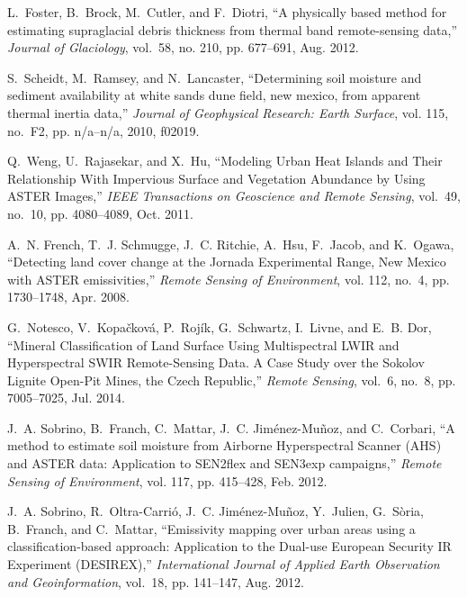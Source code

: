 \begin{thebibliography}{10}
L.~Foster, B.~Brock, M.~Cutler, and F.~Diotri, ``A physically based method for
  estimating supraglacial debris thickness from thermal band remote-sensing
  data,'' \emph{Journal of Glaciology}, vol.~58, no. 210, pp. 677--691, Aug.
  2012.

S.~Scheidt, M.~Ramsey, and N.~Lancaster, ``Determining soil moisture and
  sediment availability at white sands dune field, new mexico, from apparent
  thermal inertia data,'' \emph{Journal of Geophysical Research: Earth
  Surface}, vol. 115, no.~F2, pp. n/a--n/a, 2010, f02019.

Q.~Weng, U.~Rajasekar, and X.~Hu, ``Modeling {Urban} {Heat} {Islands} and
  {Their} {Relationship} {With} {Impervious} {Surface} and {Vegetation}
  {Abundance} by {Using} {ASTER} {Images},'' \emph{IEEE Transactions on
  Geoscience and Remote Sensing}, vol.~49, no.~10, pp. 4080--4089, Oct. 2011.

A.~N. French, T.~J. Schmugge, J.~C. Ritchie, A.~Hsu, F.~Jacob, and K.~Ogawa,
  ``Detecting land cover change at the {Jornada} {Experimental} {Range}, {New}
  {Mexico} with {ASTER} emissivities,'' \emph{Remote Sensing of Environment},
  vol. 112, no.~4, pp. 1730--1748, Apr. 2008.

G.~Notesco, V.~Kopa\v{c}kov\'{a}, P.~Roj\'{i}k, G.~Schwartz, I.~Livne, and
  E.~B. Dor, ``Mineral {Classification} of {Land} {Surface} {Using}
  {Multispectral} {LWIR} and {Hyperspectral} {SWIR} {Remote}-{Sensing} {Data}.
  {A} {Case} {Study} over the {Sokolov} {Lignite} {Open}-{Pit} {Mines}, the
  {Czech} {Republic},'' \emph{Remote Sensing}, vol.~6, no.~8, pp. 7005--7025,
  Jul. 2014.

J.~A. Sobrino, B.~Franch, C.~Mattar, J.~C. Jim\'{e}nez-Mu\~{n}oz, and
  C.~Corbari, ``A method to estimate soil moisture from {Airborne}
  {Hyperspectral} {Scanner} ({AHS}) and {ASTER} data: {Application} to
  {SEN}2flex and {SEN}3exp campaigns,'' \emph{Remote Sensing of Environment},
  vol. 117, pp. 415--428, Feb. 2012.

J.~A. Sobrino, R.~Oltra-Carri\'{o}, J.~C. Jim\'{e}nez-Mu\~{n}oz, Y.~Julien,
  G.~S\`{o}ria, B.~Franch, and C.~Mattar, ``Emissivity mapping over urban areas
  using a classification-based approach: {Application} to the {Dual}-use
  {European} {Security} {IR} {Experiment} ({DESIREX}),'' \emph{International
  Journal of Applied Earth Observation and Geoinformation}, vol.~18, pp.
  141--147, Aug. 2012.


\end{thebibliography}
